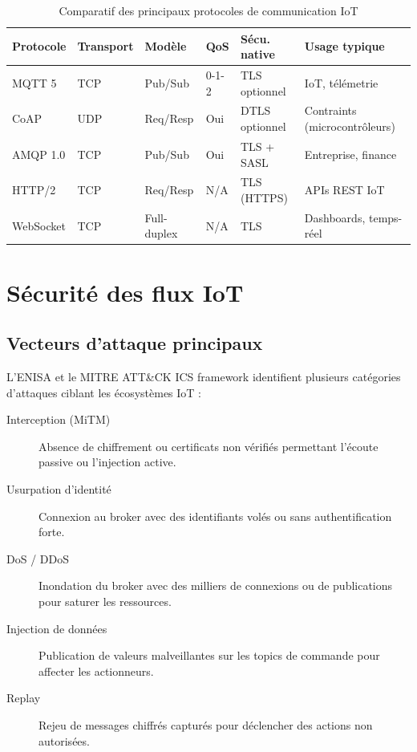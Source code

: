 \begin{table}[H]
\centering
\caption{Comparatif des principaux protocoles de communication IoT}
\label{tab:protocoles_iot}
\begin{tabular}{lllllp{3.5cm}}
\toprule
\textbf{Protocole} & \textbf{Transport} & \textbf{Modèle} & \textbf{QoS} & \textbf{Sécu. native} & \textbf{Usage typique} \\
\midrule
MQTT 5 & TCP & Pub/Sub & 0-1-2 & TLS optionnel & IoT, télémetrie \\
CoAP & UDP & Req/Resp & Oui & DTLS optionnel & Contraints (microcontrôleurs) \\
AMQP 1.0 & TCP & Pub/Sub & Oui & TLS + SASL & Entreprise, finance \\
HTTP/2 & TCP & Req/Resp & N/A & TLS (HTTPS) & APIs REST IoT \\
WebSocket & TCP & Full-duplex & N/A & TLS & Dashboards, temps-réel \\
\bottomrule
\end{tabular}
\end{table}

\section{Sécurité des flux IoT}

\subsection{Vecteurs d'attaque principaux}

L'ENISA et le MITRE ATT\&CK ICS framework identifient plusieurs catégories d'attaques ciblant les écosystèmes IoT :

\begin{description}
  \item[Interception (MiTM)] Absence de chiffrement ou certificats non vérifiés permettant l'écoute passive ou l'injection active.
  \item[Usurpation d'identité] Connexion au broker avec des identifiants volés ou sans authentification forte.
  \item[DoS / DDoS] Inondation du broker avec des milliers de connexions ou de publications pour saturer les ressources.
  \item[Injection de données] Publication de valeurs malveillantes sur les topics de commande pour affecter les actionneurs.
  \item[Replay] Rejeu de messages chiffrés capturés pour déclencher des actions non autorisées.
\end{description}

